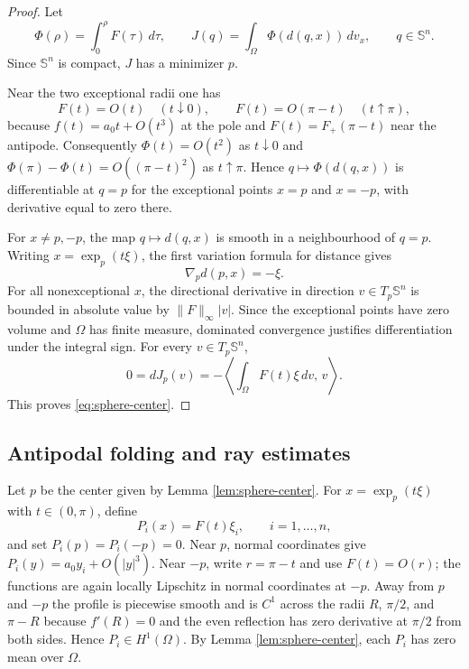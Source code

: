 \documentclass[10pt,a4paper]{amsart}
\newcommand{\Sn}{\mathbb S}
\begin{document}
\begin{proof}
Let
$$
        \Phi(\rho)=\int_0^\rho F(\tau)\,d\tau,
        \qquad
        J(q)=\int_\Omega \Phi(d(q,x))\,dv_x,
        \qquad q\in\Sn^n.
$$
Since $\Sn^n$ is compact, $J$ has a minimizer $p$.

Near the two exceptional radii one has
$$
        F(t)=O(t)\quad (t\downarrow0),
        \qquad
        F(t)=O(\pi-t)\quad (t\uparrow\pi),
$$
because $f(t)=a_0t+O(t^3)$ at the pole and $F(t)=F_+(\pi-t)$ near the antipode.  Consequently $\Phi(t)=O(t^2)$ as $t\downarrow0$ and $\Phi(\pi)-\Phi(t)=O((\pi-t)^2)$ as $t\uparrow\pi$.  Hence $q\mapsto\Phi(d(q,x))$ is differentiable at $q=p$ for the exceptional points $x=p$ and $x=-p$, with derivative equal to zero there.

For $x\ne p,-p$, the map $q\mapsto d(q,x)$ is smooth in a neighbourhood of $q=p$.  Writing $x=\exp_p(t\xi)$, the first variation formula for distance gives
$$
        \nabla_p d(p,x)=-\xi.
$$
For all nonexceptional $x$, the directional derivative in direction $v\in T_p\Sn^n$ is bounded in absolute value by $\|F\|_\infty |v|$.  Since the exceptional points have zero volume and $\Omega$ has finite measure, dominated convergence justifies differentiation under the integral sign.  For every $v\in T_p\Sn^n$,
$$
        0=dJ_p(v)=-\left\langle \int_\Omega F(t)\xi\,dv,\,v\right\rangle.
$$
This proves \eqref{eq:sphere-center}.
\end{proof}

\subsection{Antipodal folding and ray estimates}

Let $p$ be the center given by Lemma \ref{lem:sphere-center}.  For $x=\exp_p(t\xi)$ with $t\in(0,\pi)$, define
\begin{equation}\label{eq:sphere-P-def}
        P_i(x)=F(t)\xi_i,
        \qquad i=1,\dots,n,
\end{equation}
and set $P_i(p)=P_i(-p)=0$.  Near $p$, normal coordinates give $P_i(y)=a_0y_i+O(|y|^3)$.  Near $-p$, write $r=\pi-t$ and use $F(t)=O(r)$; the functions are again locally Lipschitz in normal coordinates at $-p$.  Away from $p$ and $-p$ the profile is piecewise smooth and is $C^1$ across the radii $R$, $\pi/2$, and $\pi-R$ because $f'(R)=0$ and the even reflection has zero derivative at $\pi/2$ from both sides.  Hence $P_i\in H^1(\Omega)$.  By Lemma \ref{lem:sphere-center}, each $P_i$ has zero mean over $\Omega$.
\end{document}
